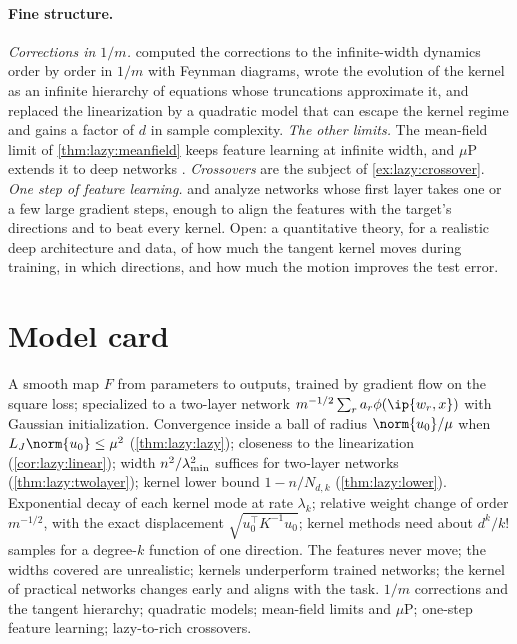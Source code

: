 \begin{refsection}
\paragraph{Fine structure.} \emph{Corrections in $1/m$.} \Textcite{DyerGurAri2020} computed the corrections to the infinite-width dynamics order by order in $1/m$ with Feynman diagrams, \textcite{HuangYau2020} wrote the evolution of the kernel as an infinite hierarchy of equations whose truncations approximate it, and \textcite{BaiLee2020} replaced the linearization by a quadratic model that can escape the kernel regime and gains a factor of $d$ in sample complexity. \emph{The other limits.} The mean-field limit of \cref{thm:lazy:meanfield} keeps feature learning at infinite width, and $\mu$P extends it to deep networks \parencite{YangHu2021}. \emph{Crossovers} are the subject of \cref{ex:lazy:crossover}. \emph{One step of feature learning.} \Textcite{BaEtAl2022} and \textcite{DamianEtAl2022} analyze networks whose first layer takes one or a few large gradient steps, enough to align the features with the target's directions and to beat every kernel. Open: a quantitative theory, for a realistic deep architecture and data, of how much the tangent kernel moves during training, in which directions, and how much the motion improves the test error.

\section{Model card}\label{sec:lazy:card}

{A smooth map $F$ from parameters to outputs, trained by gradient flow on the square loss; specialized to a two-layer network $m^{-1/2}\sum_ra_r\phi(\ip{w_r,x})$ with Gaussian initialization.}
{Convergence inside a ball of radius $\norm{u_0}/\mu$ when $L_J\norm{u_0}\le\mu^2$ (\cref{thm:lazy:lazy}); closeness to the linearization (\cref{cor:lazy:linear}); width $n^2/\lambda_{\min}^2$ suffices for two-layer networks (\cref{thm:lazy:twolayer}); kernel lower bound $1-n/N_{d,k}$ (\cref{thm:lazy:lower}).}
{Exponential decay of each kernel mode at rate $\lambda_k$; relative weight change of order $m^{-1/2}$, with the exact displacement $\sqrt{u_0^\top K^{-1}u_0}$; kernel methods need about $d^k/k!$ samples for a degree-$k$ function of one direction.}
{The features never move; the widths covered are unrealistic; kernels underperform trained networks; the kernel of practical networks changes early and aligns with the task.}
{$1/m$ corrections and the tangent hierarchy; quadratic models; mean-field limits and $\mu$P; one-step feature learning; lazy-to-rich crossovers.}


\end{refsection}
